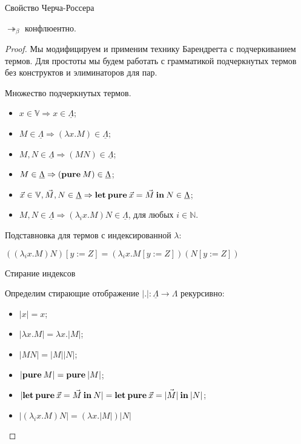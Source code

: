 \begin{theorem} Свойство Черча-Россера
$ $

$\twoheadrightarrow_{\beta}$ конфлюентно.
\end{theorem}

\begin{proof}

Мы модифицируем и применим технику Барендрегта с подчеркиванием термов. Для простоты мы будем работать с грамматикой подчеркнутых термов без конструктов и элиминаторов для пар.

\begin{defin} Множество подчеркнутых термов.

\begin{itemize}
  \item $x \in \mathbb{V} \Rightarrow x \in \underline{\Lambda}$;
  \item $M \in \underline{\Lambda} \Rightarrow (\lambda x. M) \in \underline{\Lambda}$;
  \item $M, N \in \underline{\Lambda} \Rightarrow (M N) \in \underline{\Lambda}$;
  \item $M \in \underline{\Lambda} \Rightarrow ({\bf pure \:} M) \in \underline{\Lambda}$;
  \item $\vec{x} \in \mathbb{V}, \vec{M}, N \in \underline{\Lambda} \Rightarrow {\bf let \: pure \:} \vec{x} = \vec{M} {\: \bf in \:} N \in \underline{\Lambda}$;
  \item $M, N \in \underline{\Lambda} \Rightarrow (\lambda_i x. M) N \in \underline{\Lambda}$, для любых $i \in \mathbb{N}$.
\end{itemize}
\end{defin}

\begin{defin} Подставновка для термов с индексированной $\lambda$:

$((\lambda_i x. M) N) [y := Z] = (\lambda_i x. M [y := Z]) (N [y := Z])$
\end{defin}

\begin{defin} Стирание индексов

Определим стирающие отображение $|.| : \underline{\Lambda} \to \Lambda$ рекурсивно:

\begin{itemize}
  \item $|x| = x$;
  \item $|\lambda x. M| = \lambda x. |M|$;
  \item $|M N| = |M| |N|$;
  \item $|{\bf pure \:} M| = {\bf pure \:} |M|$;
  \item $|{\bf let \: pure \:} \vec{x} = \vec{M} {\: \bf in \:} N| = {\bf let \: pure \:} \vec{x} = \vec{|M|} {\: \bf in \:} |N|$;
  \item $|(\lambda_i x. M) N| = (\lambda x. |M|) |N|$
\end{itemize}
\end{defin}


\end{proof}
